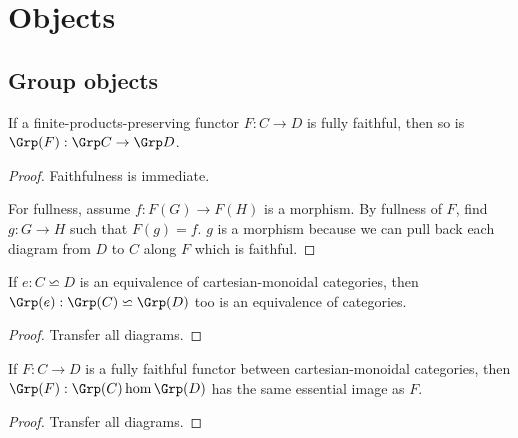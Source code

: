\section{Objects}


\subsection{Group objects}


\begin{proposition}
  \label{0-full-faithful-grp}
  \uses{}
  \leanok

  If a finite-products-preserving functor $F : C \to D$ is fully faithful,
  then so is $\Grp(F) : \Grp C \to \Grp D$.
\end{proposition}
\begin{proof}
  \uses{}
  \leanok

  Faithfulness is immediate.

  For fullness, assume $f : F(G) \to F(H)$ is a morphism. By fullness of $F$,
  find $g : G \to H$ such that $F(g) = f$. $g$ is a morphism
  because we can pull back each diagram from $D$ to $C$ along $F$ which is faithful.
\end{proof}


\begin{proposition}
  \label{0-grp-equiv}
  \uses{}
  \leanok

  If $e : C \backsimeq D$ is an equivalence of cartesian-monoidal categories,
  then $\Grp(e) : \Grp(C) \backsimeq \Grp(D)$ too is an equivalence of categories.
\end{proposition}
\begin{proof}
  \uses{}
  \leanok

  Transfer all diagrams.
\end{proof}


\begin{proposition}
  \label{0-ess-image-grp}
  \uses{}
  \leanok

  If $F : C \to D$ is a fully faithful functor between cartesian-monoidal categories,
  then $\Grp(F) : \Grp(C) \hom \Grp(D)$ has the same essential image as $F$.
\end{proposition}
\begin{proof}
  \leanok

  Transfer all diagrams.
\end{proof}


